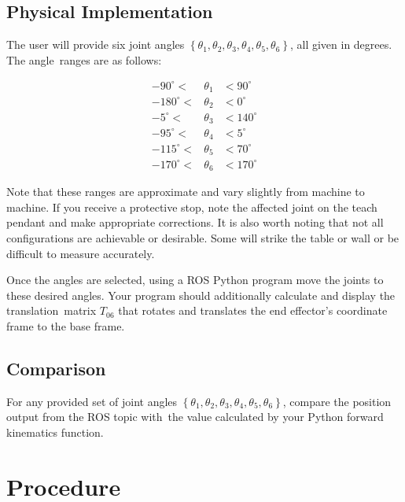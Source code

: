 \subsection{Physical Implementation}
The user will provide six joint angles $\left\{\theta_1,\theta_2,\theta_3,\theta_4,\theta_5,\theta_6\right\}$, all given in degrees.  The angle\
ranges are as follows:

\begin{eqnarray*}
-90^{\circ}<&\theta_1&<90^{\circ}\\
-180^{\circ}<&\theta_2&<0^{\circ}\\
-5^{\circ}<&\theta_3&<140^{\circ}\\
-95^{\circ}<&\theta_4&<5^{\circ}\\
-115^{\circ}<&\theta_5&<70^{\circ}\\
-170^{\circ}<&\theta_6&<170^{\circ}
\end{eqnarray*}

Note that these ranges are approximate and vary slightly from machine to machine.  If you receive a protective stop, note the affected joint on the teach pendant and make appropriate corrections.  It is also worth noting that not all configurations are achievable or desirable.  Some will strike the table or wall or be difficult to measure accurately.

Once the angles are selected, using a ROS Python program move the joints to these desired angles.  Your program should additionally calculate and display the translation\
matrix $T_{06}$ that rotates and translates the end effector's coordinate frame to the base frame.

\subsection{Comparison}
For any provided set of joint angles $\left\{\theta_1,\theta_2,\theta_3,\theta_4,\theta_5,\theta_6\right\}$, compare the position output from the ROS topic with\
the value calculated by your Python forward kinematics function.  

\section{Procedure}
	
